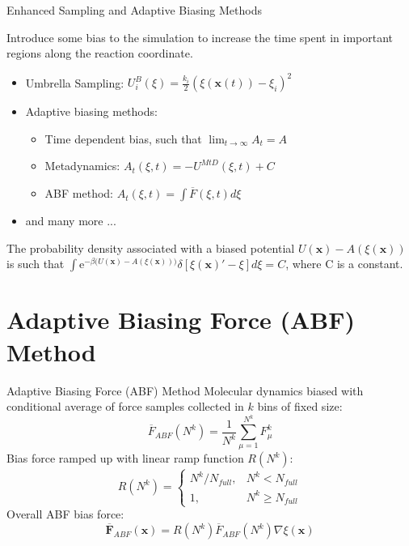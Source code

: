 \documentclass[10pt]{beamer}
\begin{document}
\begin{frame}{Enhanced Sampling and Adaptive Biasing Methods}

Introduce some bias to the simulation to increase the time spent in important regions along the reaction coordinate.
\begin{itemize}
  \item Umbrella Sampling: $U_i^B(\xi) = \frac{k_i}{2}(\xi(\textbf{x}(t))-\xi_i)^2$\\
  \item Adaptive biasing methods:\\
  \begin{itemize}
    \item Time dependent bias, such that $\lim_{t\to\infty}A_t = A$\\
    \item Metadynamics: $A_t(\xi,t)= -U^{MtD}(\xi,t) + C$\\
    \item ABF method: $A_t(\xi,t)=\int \overline{F}(\xi,t)d\xi$\\
  \end{itemize}
  \item and many more ...
\end{itemize}

\begin{tcolorbox}[colback=green!5,colframe=green!40!black, title=Intuition for Adaptive Biasing Methods]
The probability density associated with a biased potential $U(\textbf{x})-A(\xi(\textbf{x}))$ is such that
$\int \text{e}^{-\beta\bigl(U(\textbf{x})-A(\xi(\textbf{x}))\bigr)}\delta[\xi(\textbf{x})'-\xi]d\xi = C$, where C is a constant.
\end{tcolorbox}
\end{frame}

\section{Adaptive Biasing Force (ABF) Method}
\begin{frame}{Adaptive Biasing Force (ABF) Method}
Molecular dynamics biased with conditional average of force samples collected in $k$ bins of fixed size:
\begin{equation}
  \overline{F}_{ABF}(N^k) = \frac{1}{N^{k}} \sum_{\mu=1}^{N^{k}} F_{\mu}^{k}
\end{equation}
Bias force ramped up with linear ramp function $R(N^k)$:
\begin{equation}
R(N^k)=\left\{\begin{array}{ll} N^k/N_{full}, & N^{k} < N_{full} \\
                                             1, & N^{k} \geq  N_{full}\end{array}\right.
\end{equation}
Overall ABF bias force:
\begin{equation}
  \overline{\textbf{F}}_{ABF}(\textbf{x}) = R(N^k)\overline{F}_{ABF}(N^k)\nabla\xi(\textbf{x})
\end{equation}
\end{frame}
\end{document}
